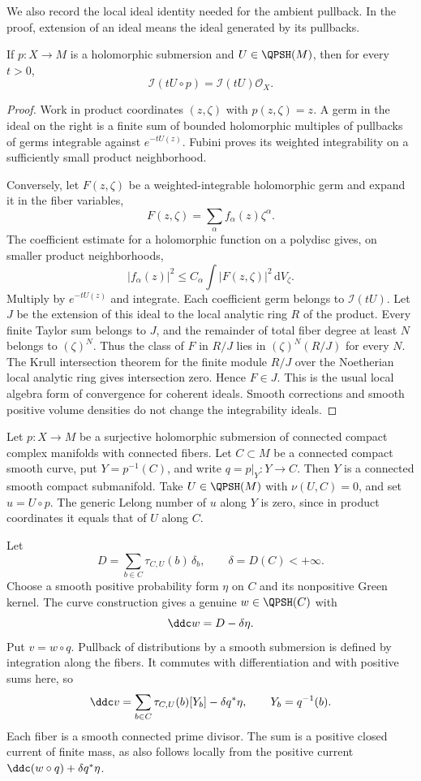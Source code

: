 We also record the local ideal identity needed for the ambient pullback. In the proof, extension of an ideal means the ideal generated by its pullbacks.

\begin{lemma}\label{lem:submersion-multiplier-pullback}
If $p:X\to M$ is a holomorphic submersion and $U\in\QPSH(M)$, then for every $t>0$,
\[
 \mathcal I(tU\circ p)
       =\mathcal I(tU)\mathcal O_X.
\]
\end{lemma}
\begin{proof}
Work in product coordinates $(z,\zeta)$ with $p(z,\zeta)=z$. A germ in the ideal on the right is a finite sum of bounded holomorphic multiples of pullbacks of germs integrable against $e^{-tU(z)}$. Fubini proves its weighted integrability on a sufficiently small product neighborhood.

Conversely, let $F(z,\zeta)$ be a weighted-integrable holomorphic germ and expand it in the fiber variables,
\[
 F(z,\zeta)=\sum_\alpha f_\alpha(z)\zeta^\alpha.
\]
The coefficient estimate for a holomorphic function on a polydisc gives, on smaller product neighborhoods,
\[
 |f_\alpha(z)|^2\leq C_\alpha
       \int |F(z,\zeta)|^2\,\mathrm{d}V_\zeta.
\]
Multiply by $e^{-tU(z)}$ and integrate. Each coefficient germ belongs to $\mathcal I(tU)$. Let $J$ be the extension of this ideal to the local analytic ring $R$ of the product. Every finite Taylor sum belongs to $J$, and the remainder of total fiber degree at least $N$ belongs to $(\zeta)^N$. Thus the class of $F$ in $R/J$ lies in $(\zeta)^N(R/J)$ for every $N$. The Krull intersection theorem for the finite module $R/J$ over the Noetherian local analytic ring gives intersection zero. Hence $F\in J$. This is the usual local algebra form of convergence for coherent ideals. Smooth corrections and smooth positive volume densities do not change the integrability ideals.
\end{proof}

Let $p:X\to M$ be a surjective holomorphic submersion of connected compact complex manifolds with connected fibers. Let $C\subset M$ be a connected compact smooth curve, put $Y=p^{-1}(C)$, and write $q=p|_Y:Y\to C$. Then $Y$ is a connected smooth compact submanifold. Take $U\in\QPSH(M)$ with $\nu(U,C)=0$, and set $u=U\circ p$. The generic Lelong number of $u$ along $Y$ is zero, since in product coordinates it equals that of $U$ along $C$.

Let
\[
 D=\sum_{b\in C}\tau_{C,U}(b)\,\delta_b,
 \qquad \delta=D(C)<+\infty.
\]
Choose a smooth positive probability form $\eta$ on $C$ and its nonpositive Green kernel. The curve construction gives a genuine $w\in\QPSH(C)$ with
\[
 \ddc w=D-\delta\eta.
\]
Put $v=w\circ q$. Pullback of distributions by a smooth submersion is defined by integration along the fibers. It commutes with differentiation and with positive sums here, so
\begin{equation}\label{eq:curve-fiber-divisorial-current}
 \ddc v=\sum_{b\in C}\tau_{C,U}(b)[Y_b]-\delta q^*\eta,
 \qquad Y_b=q^{-1}(b).
\end{equation}
Each fiber is a smooth connected prime divisor. The sum is a positive closed current of finite mass, as also follows locally from the positive current $\ddc(w\circ q)+\delta q^*\eta$.

